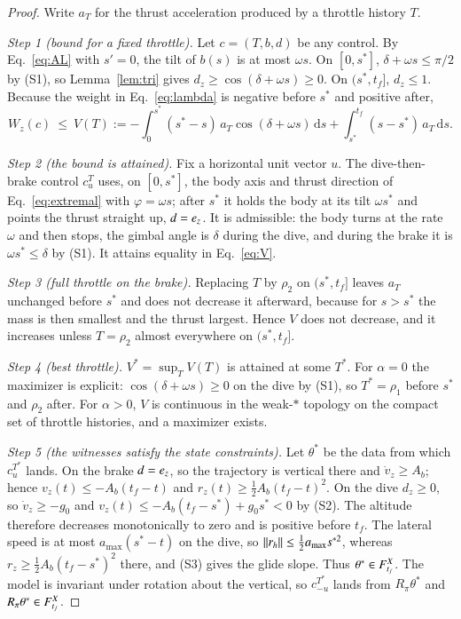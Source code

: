 \begin{proof}
Write $a_T$ for the thrust acceleration produced by a throttle history $T$.

\emph{Step 1 (bound for a fixed throttle).} Let $c=(T,b,d)$ be any control. By Eq.~\eqref{eq:AL} with $s'=0$, the tilt of $b(s)$
is at most $\omega s$. On $[0,s^*]$, $\delta+\omega s\le\pi/2$ by (S1), so Lemma~\ref{lem:tri} gives
$d_z\ge\cos(\delta+\omega s)\ge0$. On $(s^*,t_f]$, $d_z\le1$. Because the weight in Eq.~\eqref{eq:lambda} is negative before
$s^*$ and positive after,
\begin{equation}\label{eq:V}
W_z(c)\ \le\ V(T):=-\int_0^{s^*}(s^*-s)\,a_T\cos(\delta+\omega s)\,\mathrm ds+\int_{s^*}^{t_f}(s-s^*)\,a_T\,\mathrm ds .
\end{equation}

\emph{Step 2 (the bound is attained).} Fix a horizontal unit vector $u$. The dive-then-brake control $c^T_u$ uses, on
$[0,s^*]$, the body axis and thrust direction of Eq.~\eqref{eq:extremal} with $\varphi=\omega s$; after $s^*$ it holds the
body at its tilt $\omega s^*$ and points the thrust straight up, $d=e_z$. It is admissible: the body turns at the rate
$\omega$ and then stops, the gimbal angle is $\delta$ during the dive, and during the brake it is $\omega s^*\le\delta$ by (S1).
It attains equality in Eq.~\eqref{eq:V}.

\emph{Step 3 (full throttle on the brake).} Replacing $T$ by $\rho_2$ on $(s^*,t_f]$ leaves $a_T$ unchanged before $s^*$
and does not decrease it afterward, because for $s>s^*$ the mass is then smallest and the thrust largest. Hence $V$ does not
decrease, and it increases unless $T=\rho_2$ almost everywhere on $(s^*,t_f]$.

\emph{Step 4 (best throttle).} $V^*=\sup_TV(T)$ is attained at some $T^*$. For $\alpha=0$ the maximizer is explicit:
$\cos(\delta+\omega s)\ge0$ on the dive by (S1), so $T^*=\rho_1$ before $s^*$ and $\rho_2$ after. For $\alpha>0$, $V$ is
continuous in the weak-$*$ topology on the compact set of throttle histories, and a maximizer exists.

\emph{Step 5 (the witnesses satisfy the state constraints).} Let $\theta^*$ be the data from which $c^{T^*}_u$ lands. On
the brake $d=e_z$, so the trajectory is vertical there and $\dot v_z\ge A_b$; hence $v_z(t)\le-A_b(t_f-t)$ and
$r_z(t)\ge\tfrac12A_b(t_f-t)^2$. On the dive $d_z\ge0$, so $\dot v_z\ge-g_0$ and
$v_z(t)\le-A_b(t_f-s^*)+g_0s^*<0$ by (S2). The altitude therefore decreases monotonically to zero and is positive before
$t_f$. The lateral speed is at most $a_{\max}(s^*-t)$ on the dive, so $\lVert r_h\rVert\le\tfrac12a_{\max}s^{*2}$, whereas
$r_z\ge\tfrac12A_b(t_f-s^*)^2$ there, and (S3) gives the glide slope. Thus $\theta^*\in F^{X}_{t_f}$. The model is invariant under
rotation about the vertical, so $c^{T^*}_{-u}$ lands from $R_\pi\theta^*$ and $R_\pi\theta^*\in F^{X}_{t_f}$.


\end{proof}
